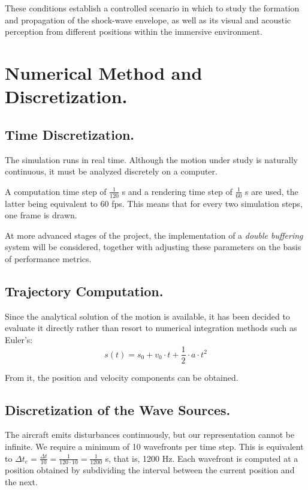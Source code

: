\documentclass[10.5pt]{article}
\begin{document}
	These conditions establish a controlled scenario in which to study the formation and propagation of the shock-wave envelope, as well as its visual and acoustic perception from different positions within the immersive environment.
	
	\newpage 
	
	\section{Numerical Method and Discretization.}
	
	\subsection{Time Discretization.}
	
	The simulation runs in real time. Although the motion under study is naturally continuous, it must be analyzed discretely on a computer.
	
	A computation time step of $\frac{1}{120}$ s and a rendering time step of $\frac{1}{60}$ s are used, the latter being equivalent to 60 fps. This means that for every two simulation steps, one frame is drawn. 
	
	At more advanced stages of the project, the implementation of a \textit{double buffering} system will be considered, together with adjusting these parameters on the basis of performance metrics. 
	
	\subsection{Trajectory Computation.}
	
	Since the analytical solution of the motion is available, it has been decided to evaluate it directly rather than resort to numerical integration methods such as Euler's:
	\begin{equation*}
		s(t) = s_0 + v_0 \cdot t + \frac{1}{2} \cdot a \cdot t^2
	\end{equation*} 
	
	From it, the position and velocity components can be obtained.
	
	\subsection{Discretization of the Wave Sources.}
	
	The aircraft emits disturbances continuously, but our representation cannot be infinite.
	We require a minimum of 10 wavefronts per time step. This is equivalent to $\Delta t_e = \frac{\Delta t}{10} = \frac{1}{120 \cdot 10} = \frac{1}{1200}$ s, that is, 1200 Hz. Each wavefront is computed at a position obtained by subdividing the interval between the current position and the next.
	
\end{document}
